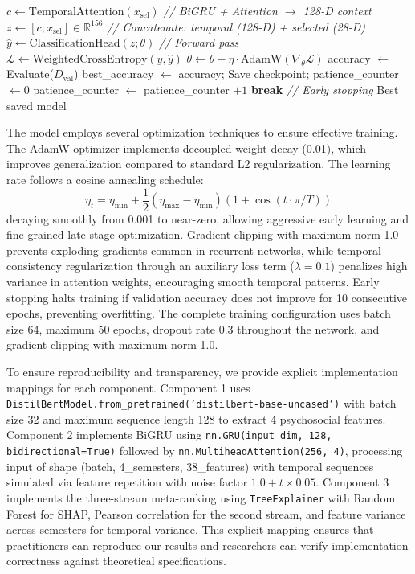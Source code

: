 \documentclass[journal]{IEEEtran}
\begin{document}
\begin{algorithm}[h]
\begin{algorithmic}[1]
        \STATE $c \leftarrow \text{TemporalAttention}(x_{\text{sel}})$ \quad \textit{// BiGRU + Attention $\rightarrow$ 128-D context}
        \STATE $z \leftarrow [c; x_{\text{sel}}] \in \mathbb{R}^{156}$ \quad \textit{// Concatenate: temporal (128-D) + selected (28-D)}
        \STATE $\hat{y} \leftarrow \text{ClassificationHead}(z; \theta)$ \quad \textit{// Forward pass}
        \STATE $\mathcal{L} \leftarrow \text{WeightedCrossEntropy}(y, \hat{y})$
        \STATE $\theta \leftarrow \theta - \eta \cdot \text{AdamW}(\nabla_\theta \mathcal{L})$
    \ENDFOR
    \STATE accuracy $\leftarrow$ Evaluate($D_{\text{val}}$)
        \STATE best\_accuracy $\leftarrow$ accuracy; Save checkpoint; patience\_counter $\leftarrow 0$
    \ELSE
        \STATE patience\_counter $\leftarrow$ patience\_counter $+ 1$
    \ENDIF
        \STATE \textbf{break} \quad \textit{// Early stopping}
    \ENDIF
\ENDFOR
\RETURN Best saved model
\end{algorithmic}
\end{algorithm}

The model employs several optimization techniques to ensure effective training. The AdamW optimizer implements decoupled weight decay (0.01), which improves generalization compared to standard L2 regularization. The learning rate follows a cosine annealing schedule:
\begin{equation}
\eta_t = \eta_{\min} + \frac{1}{2}(\eta_{\max} - \eta_{\min})(1 + \cos(t \cdot \pi/T))
\end{equation}
decaying smoothly from 0.001 to near-zero, allowing aggressive early learning and fine-grained late-stage optimization. Gradient clipping with maximum norm 1.0 prevents exploding gradients common in recurrent networks, while temporal consistency regularization through an auxiliary loss term ($\lambda = 0.1$) penalizes high variance in attention weights, encouraging smooth temporal patterns. Early stopping halts training if validation accuracy does not improve for 10 consecutive epochs, preventing overfitting. The complete training configuration uses batch size 64, maximum 50 epochs, dropout rate 0.3 throughout the network, and gradient clipping with maximum norm 1.0.

To ensure reproducibility and transparency, we provide explicit implementation mappings for each component. Component 1 uses \texttt{DistilBertModel.from\_pretrained('distilbert-base-uncased')} with batch size 32 and maximum sequence length 128 to extract 4 psychosocial features. Component 2 implements BiGRU using \texttt{nn.GRU(input\_dim, 128, bidirectional=True)} followed by \texttt{nn.MultiheadAttention(256, 4)}, processing input of shape (batch, 4\_semesters, 38\_features) with temporal sequences simulated via feature repetition with noise factor $1.0 + t \times 0.05$. Component 3 implements the three-stream meta-ranking using \texttt{TreeExplainer} with Random Forest for SHAP, Pearson correlation for the second stream, and feature variance across semesters for temporal variance. This explicit mapping ensures that practitioners can reproduce our results and researchers can verify implementation correctness against theoretical specifications.
\end{document}
